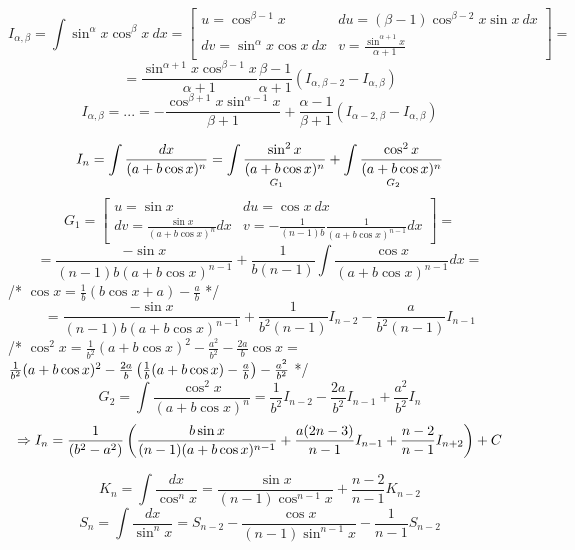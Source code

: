 \documentclass[main]{subfiles}
\begin{document}
    \begin{Example}
        \[I_{\alpha,\beta} = \int \sin^{\alpha} x \cos^{\beta} x\ dx = \left[\begin{matrix}
            u = \cos^{\beta - 1} x & du = (\beta - 1) \cos^{\beta - 2} x \sin x\ dx\\
            dv = \sin^{\alpha} x \cos x\ dx & v = \frac{\sin^{\alpha + 1}x}{\alpha + 1}
        \end{matrix}\right] =\]
        \[= \frac{\sin^{\alpha + 1}x \cos^{\beta - 1} x}{\alpha + 1} \frac{\beta - 1}{\alpha + 1}(I_{\alpha,\beta -2} - I_{\alpha,\beta})\]
        \[I_{\alpha,\beta} = ... = - \frac{\cos^{\beta + 1}x \sin^{\alpha - 1} x}{\beta + 1} + \frac{\alpha - 1}{\beta + 1}(I_{\alpha - 2,\beta} - I_{\alpha,\beta})\]
    \end{Example}

    \begin{Example}
        \[I_n = \int \frac{dx}{(a + b\cos x)^n} = \underset{G_1}{\int \frac{\sin^2 x}{(a + b\cos x)^n}} + \underset{G_2}{\int \frac{\cos^2 x}{(a + b\cos x)^n}}\]
        \[G_1 = \left[\begin{matrix}
            u = \sin x & du = \cos x\ dx\\
            dv = \frac{\sin x}{(a + b\cos x)^n}dx & v = -\frac{1}{(n-1)b} \frac{1}{(a + b\cos x)^{n-1}}dx
        \end{matrix}\right] =\]
        \[= \frac{-\sin x}{(n-1) b (a + b\cos x)^{n-1}} + \frac{1}{b(n-1)} \int \frac{\cos x}{(a + b\cos x)^{n-1}} dx =\]
        /* $\cos x = \frac{1}{b}(b \cos x + a) - \frac{a}{b}$ */
        \[= \frac{-\sin x}{(n-1) b (a + b\cos x)^{n-1}} + \frac{1}{b^2 (n-1)} I_{n-2} - \frac{a}{b^2(n-1)} I_{n-1}\]
        /* $\cos^2 x = \frac{1}{b^2}(a + b\cos x)^2 - \frac{a^2}{b^2} - \frac{2a}{b} \cos x =$\\
        $\frac{1}{b^2} (a + b \cos x)^2 - \frac{2a}{b}\left(\frac{1}{b}(a + b\cos x) - \frac{a}{b}\right) - \frac{a^2}{b^2}$ */
        \[G_2 = \int \frac{\cos^2 x}{(a + b \cos x)^n} = \frac{1}{b^2} I_{n-2} - \frac{2a}{b^2} I_{n-1} + \frac{a^2}{b^2} I_n\]
        \[\Rightarrow I_n = \frac{1}{(b^2 - a^2)} \left(\frac{b \sin x}{(n-1)(a + b\cos x)^{n-1}} + \frac{a(2n-3)}{n-1} I_{n-1} + \frac{n-2}{n-1} I_{n+2}\right) + C\]
    \end{Example}

    \begin{Consequence}
        \[K_n = \int \frac{dx}{\cos^n x} = \frac{\sin x}{(n-1) \cos^{n-1} x} + \frac{n-2}{n-1} K_{n-2}\]
        \[S_n = \int \frac{dx}{\sin^n x} = S_{n-2} - \frac{\cos x}{(n-1)\sin^{n-1}x} - \frac{1}{n-1} S_{n-2}\]
    \end{Consequence}
\end{document}
